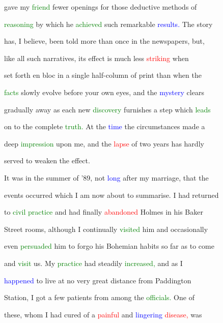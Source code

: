  gave my \textcolor{green}{friend} fewer openings for those deductive methods of

 \textcolor{green}{reasoning} by which he \textcolor{green}{achieved} such \textcolor{BurntOrange}{remarkable} \textcolor{blue}{results.} The story

 has, I believe, been told more than once in the newspapers, but,

 like all such narratives, its effect is much less \textcolor{red}{striking} when

 set forth en bloc in a single half-column of print than when the

 \textcolor{green}{facts} slowly evolve before your own eyes, and the \textcolor{blue}{mystery} clears

 gradually away as each new \textcolor{green}{discovery} furnishes a step which \textcolor{green}{leads}

 on to the complete \textcolor{green}{truth.} At the \textcolor{blue}{time} the circumstances made a

 deep \textcolor{green}{impression} upon me, and the \textcolor{red}{lapse} of two years has hardly

 \textcolor{BurntOrange}{served} to weaken the effect.



 It was in the summer of '89, not \textcolor{blue}{long} after my \textcolor{BurntOrange}{marriage,} that the

 events occurred which I am now about to summarise. I had returned

 to \textcolor{green}{civil} \textcolor{green}{practice} and had \textcolor{BurntOrange}{finally} \textcolor{red}{abandoned} Holmes in his Baker

 Street rooms, although I continually \textcolor{green}{visited} him and occasionally

 even \textcolor{green}{persuaded} him to forgo his Bohemian habits so far as to come

 and \textcolor{green}{visit} us. My \textcolor{green}{practice} had steadily \textcolor{green}{increased,} and as I

 \textcolor{blue}{happened} to live at no very great distance from Paddington

 Station, I got a few \textcolor{BurntOrange}{patients} from among the \textcolor{green}{officials.} One of

 these, whom I had cured of a \textcolor{red}{painful} and \textcolor{blue}{lingering} \textcolor{red}{disease,} was

